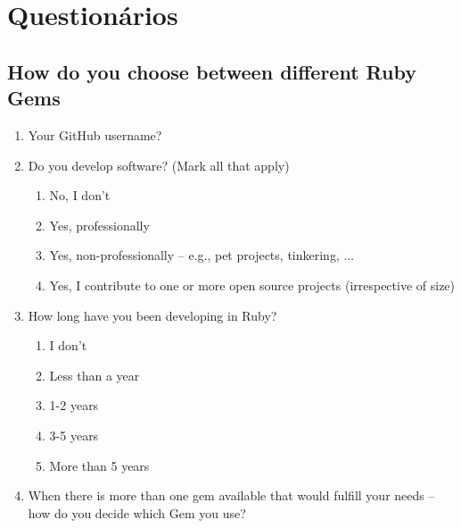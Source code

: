 \appendix
\chapter{Questionários}

\section{How do you choose between different Ruby Gems}

\begin{enumerate}
  \item \hspace{1pt} Your GitHub username?

  \item \hspace{1pt} Do you develop software? (Mark all that apply)
  \begin{enumerate}
	\item \hspace{1pt} No, I don't
    \item \hspace{1pt} Yes, professionally
    \item \hspace{1pt} Yes, non-professionally -- e.g., pet projects, tinkering, ...
    \item \hspace{1pt} Yes, I contribute to one or more open source projects (irrespective of size)
  \end{enumerate}

  \item \hspace{1pt} How long have you been developing in Ruby?
    \begin{enumerate}
      \item \hspace{1pt} I don't
      \item \hspace{1pt} Less than a year
      \item \hspace{1pt} 1-2 years
      \item \hspace{1pt} 3-5 years
      \item \hspace{1pt} More than 5 years
    \end{enumerate}

  \item \hspace{1pt} When there is more than one gem available that would fulfill your needs -- how do you decide which Gem you use?


\end{enumerate}
